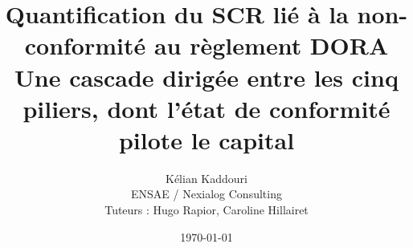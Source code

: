 \newcommand{\rob}{\cellcolor{softgreen}\textbf{robuste}}
\newcommand{\feat}{\cellcolor{lightblue!60}\textbf{voulu}}
\newcommand{\ass}{\cellcolor{softamber}\textbf{assumé}}
\newcommand{\oui}{\textcolor{navy}{$\checkmark$}}

\newcommand{\matcomp}{\emph{(voir le Matériel Complémentaire en ligne)}}
\newcommand{\non}{\textcolor{accent}{$\times$}}
\newcommand{\cascell}{\cellcolor{softgreen}}

\titleformat{\chapter}[hang]{\normalfont\huge\bfseries\color{navy}}{\thechapter}{0.6em}{}
\titlespacing*{\chapter}{0pt}{-8pt}{20pt}
\titleformat{\section}{\normalfont\large\bfseries\color{navy}}{\thesection}{0.6em}{}
\titleformat{\subsection}{\normalfont\normalsize\bfseries\color{bluemid}}{\thesubsection}{0.5em}{}

\title{\vspace{-1cm}\color{navy}\bfseries Quantification du SCR lié à la non-conformité au règlement DORA\\[6pt]
  \large Une cascade dirigée entre les cinq piliers, dont l'état de conformité pilote le capital}
\author{Kélian Kaddouri \\ \small ENSAE / Nexialog Consulting \\ \small Tuteurs : Hugo Rapior, Caroline Hillairet}
\date{\today}
